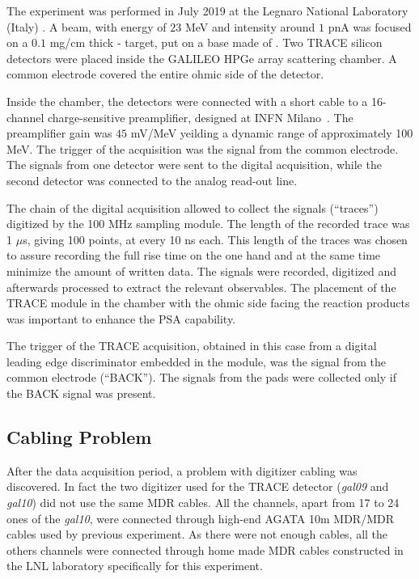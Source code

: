 The experiment was performed in July 2019 at the Legnaro National Laboratory
(Italy) \cite{kuba:compa}. A  beam, with energy of $23$ MeV and intensity around $1$ pnA
was focused on a $0.1$ mg/cm thick  - target, put on a base
made of .
Two TRACE silicon detectors were placed inside the GALILEO HPGe array
scattering chamber. A common electrode covered the entire ohmic side of the
detector.

\bigbreak

Inside the chamber, the detectors were connected with a short cable to a
16-channel charge-sensitive preamplifier, designed at INFN Milano~\cite{strano}.
The preamplifier gain was $45$ mV/MeV yeilding a dynamic range of
approximately 100 MeV. The trigger of the acquisition was the signal from the
common electrode. The signals from one detector were sent to the digital
acquisition, while the second detector was connected to the analog read-out
line.

\bigbreak

The chain of the digital acquisition allowed to collect the signals (“traces”)
digitized by the 100 MHz sampling module. The length of the recorded trace was
1 $\mu$s, giving 100 points, at every 10 ns each. This length of the traces
was chosen to assure recording the full rise time on the one hand and at the
same time minimize the amount of written data. The signals were recorded,
digitized and afterwards processed to extract the relevant observables. The
placement of the TRACE module in the chamber with the ohmic side facing the
reaction products was important to enhance the PSA capability.

\bigbreak

The trigger of the TRACE acquisition, obtained in this case from a digital
leading edge discriminator embedded in the module, was the signal from the
common electrode (“BACK”). The signals from the pads were collected only if
the BACK signal was present.

\subsection{Cabling Problem}

After the data acquisition period, a problem with digitizer cabling was
discovered. In fact the two digitizer used for the TRACE detector
(\textit{gal09} and \textit{gal10}) did not use the same MDR cables. All the
channels, apart from 17 to 24 ones of the \textit{gal10}, were connected through
high-end AGATA 10m MDR/MDR cables used by previous experiment. As there were
not enough cables, all the others channels were connected through home made
MDR cables constructed in the LNL laboratory specifically for this experiment.

